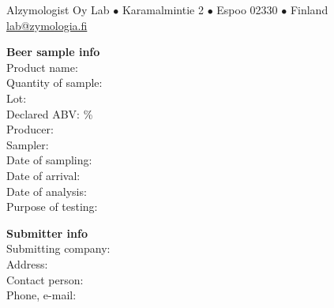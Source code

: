 \documentclass[12pt,a4paper,english]{ltxdoc}
\begin{document}
    
    \begin{flushright}
        Alzymologist Oy Lab $\bullet$ Karamalmintie 2 $\bullet$ Espoo 02330 $\bullet$ Finland \\
        \href{mailto:lab@zymologia.fi}{lab@zymologia.fi} \\
    \end{flushright}
    
    \begin{flushleft}
        \begin{multicols}{2}
            {\textbf{Beer sample info}} \\
            Product name:  \\
            Quantity of sample:  \\
            Lot:  \\
            Declared ABV:  \% \\
            Producer:  \\
            Sampler:  \\
            Date of sampling:  \\
            Date of arrival:  \\
            Date of analysis:  \\
            Purpose of testing:  \\

            \columnbreak

            {\textbf{Submitter info}} \\
            Submitting company:  \\
            Address:  \\
            Contact person:  \\
            Phone, e-mail:  \\
        \end{multicols}
    \end{flushleft}
\end{document}
